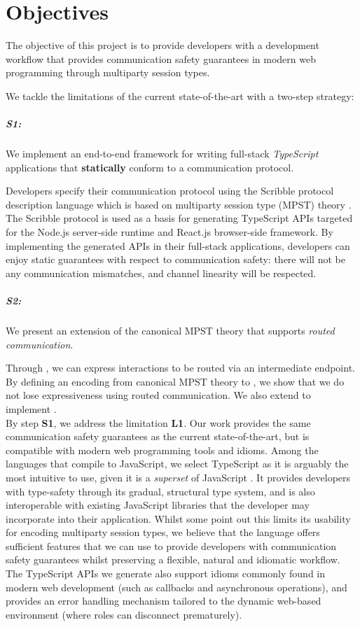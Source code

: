 \section{Objectives}

The objective of this project is to provide
developers with a development workflow
that provides communication safety guarantees in modern
web programming through multiparty session types.

We tackle the limitations of the current
state-of-the-art with a two-step strategy:

\subparagraph{S1: \codegen}
We implement an end-to-end framework
for writing full-stack \textit{TypeScript} applications that
\textbf{statically} conform to a communication protocol.

Developers specify their communication protocol using
the Scribble protocol description language \cite{Scribble}
which is based on multiparty session type (MPST) theory \cite{MPST}.
The Scribble protocol is used as a basis for generating
TypeScript APIs targeted for the Node.js server-side runtime
and React.js browser-side framework.
By implementing the generated APIs in their full-stack applications,
developers can enjoy static guarantees with respect 
to communication safety: 
there will not be any communication mismatches,
and channel linearity will be respected.

\subparagraph{S2: \newtheory}
We present an extension of the canonical MPST
theory that supports \textit{routed communication}.

Through \newtheory, we can express interactions to be
routed via an intermediate endpoint.
By defining an encoding from canonical MPST theory
to \newtheory, we show that we do not lose expressiveness
using routed communication.
We also extend \codegen to implement \newtheory.
\\

By step \textbf{S1}, we address the limitation \textbf{L1}.
Our work provides the same communication safety guarantees
as the current state-of-the-art, but 
is compatible with modern web programming tools and idioms.
Among the languages that compile to JavaScript,
we select TypeScript as it is arguably the most intuitive
to use, given it is a \textit{superset} of JavaScript 
\cite{UnderstandingTypeScript}.
It provides developers
with type-safety through its gradual, structural type system,
and is also interoperable with existing JavaScript libraries
that the developer may incorporate into their application.
Whilst some \cite{MVU2020} point out this limits its usability for
encoding multiparty session types, we believe that the language
offers sufficient features that we can use to provide developers with
communication safety guarantees whilst preserving a flexible, natural
and idiomatic workflow.
The TypeScript APIs we generate also support idioms commonly
found in modern web development (such as callbacks and
asynchronous operations), and provides an error handling
mechanism tailored to the dynamic web-based environment
(where roles can disconnect prematurely).

